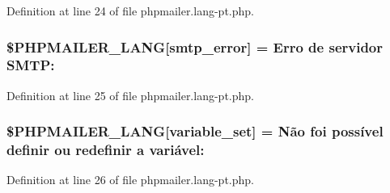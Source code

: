 Definition at line 24 of file phpmailer.\+lang-\/pt.\+php.

\subsubsection[{\texorpdfstring{\$\+P\+H\+P\+M\+A\+I\+L\+E\+R\+\_\+\+L\+A\+NG}{$PHPMAILER_LANG}}]{\setlength{\rightskip}{0pt plus 5cm}\$P\+H\+P\+M\+A\+I\+L\+E\+R\+\_\+\+L\+A\+NG\mbox{[}\textquotesingle{}smtp\+\_\+error\textquotesingle{}\mbox{]} = \textquotesingle{}Erro de servidor S\+M\+T\+P\+: \textquotesingle{}}\hypertarget{phpmailer_8lang-pt_8php_a7d9cffba1e669c845f8a4c891ee50064}{}\label{phpmailer_8lang-pt_8php_a7d9cffba1e669c845f8a4c891ee50064}


Definition at line 25 of file phpmailer.\+lang-\/pt.\+php.

\subsubsection[{\texorpdfstring{\$\+P\+H\+P\+M\+A\+I\+L\+E\+R\+\_\+\+L\+A\+NG}{$PHPMAILER_LANG}}]{\setlength{\rightskip}{0pt plus 5cm}\$P\+H\+P\+M\+A\+I\+L\+E\+R\+\_\+\+L\+A\+NG\mbox{[}\textquotesingle{}variable\+\_\+set\textquotesingle{}\mbox{]} = \textquotesingle{}Não foi possível definir ou redefinir {\bf a} variável\+: \textquotesingle{}}\hypertarget{phpmailer_8lang-pt_8php_af795debc7a739d038742691c358d9032}{}\label{phpmailer_8lang-pt_8php_af795debc7a739d038742691c358d9032}


Definition at line 26 of file phpmailer.\+lang-\/pt.\+php.

